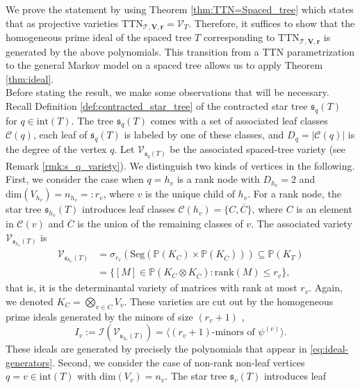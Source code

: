 \documentclass[12pt]{article}
\theoremstyle{definition}
\numberwithin{theorem}{section}
\newcommand{\PP}{\mathbb{P}}
\newcommand{\V}{\mathcal{V}}
\begin{document}
We prove the statement by using Theorem \ref{thm:TTN=Spaced_tree} which states that as projective varieties $\mathrm{TTN}_{\mathscr{T},\mathbf{V}, \mathbf{r}} = \mathcal{V}_T$. Therefore, it suffices to show that the homogeneous prime ideal of the spaced tree $T$ corresponding to $\mathrm{TTN}_{\mathscr{T},\mathbf{V}, \mathbf{r}}$ is generated by the above polynomials. This transition from a TTN parametrization to the general Markov model on a spaced tree allows us to apply Theorem \ref{thm:ideal}. 
\\
Before stating the result, we make some observations that will be necessary. Recall Definition \ref{def:contracted_star_tree} of the contracted star tree $\mathfrak{s}_q(T)$ for 
$q \in \mathrm{int}(T)$. The tree $\mathfrak{s}_q(T)$ comes with a set of associated leaf classes $\mathcal C(q)$, each leaf of $\mathfrak{s}_q(T)$ is labeled by one of these classes, and $D_q = |\mathcal C(q)|$ is the degree of the vertex $q$. Let $\mathcal{V}_{\mathfrak{s}_q(T)}$ be the associated spaced-tree variety (see Remark \ref{rmk:s_q_variety}). We distinguish two kinds of vertices in the following. First, we consider the case when $q=h_v$ is a rank node with $D_{h_v}=2$ and $\mathrm{dim}(V_{h_v}) = n_{h_v} =: r_v$, where $v$ is the unique child of $h_v$. For a rank node, the star tree $\mathfrak{s}_{h_v}(T)$ introduces leaf classes $\mathcal C(h_v) = \{C, \overline{C}\}$, where $C$ is an element in $\mathcal C(v)$ and $\overline{C}$ is the union of the remaining classes of $v$. The associated variety $\V_{\mathfrak{s}_{h_v}(T)}$ is
\begin{align*}
    \V_{\mathfrak{s}_{h_v}(T)} &= \sigma_{r_v}\left(\mathrm{Seg}\left( \PP\left(K_C\right)\times \PP\left(K_{\overline{C}}\right)\right)\right) \subseteq \PP\left( K_T \right) \\
    &=\{[M] \in \PP\left(K_C  \otimes K_{\overline{C}}\right) : \mathrm{rank}(M) \leq r_v \},
\end{align*}
that is, it is the determinantal variety of matrices with rank at most $r_v$. Again, we denoted $K_C =\bigotimes_{v\in C} V_v$. These varieties are cut out by the homogeneous prime ideals generated by the minors of size $(r_v +1)$ \cite{bruns1988}, 
\begin{equation*}
    I_v :=\mathcal I(\V_{\mathfrak{s}_{h_v}(T)})
= \Big\langle (r_v + 1)\textrm{-minors of }\psi^{(v)} \Big\rangle.
\end{equation*}
These ideals are generated by precisely the polynomials that appear in 
 \eqref{eq:ideal-generators}.
Second, we consider the case of non-rank non-leaf vertices $q = v \in \mathrm{int}(T)$ with $\mathrm{dim}(V_v) = n_v$. The star tree $\mathfrak{s}_v(T)$ introduces leaf
\end{document}
